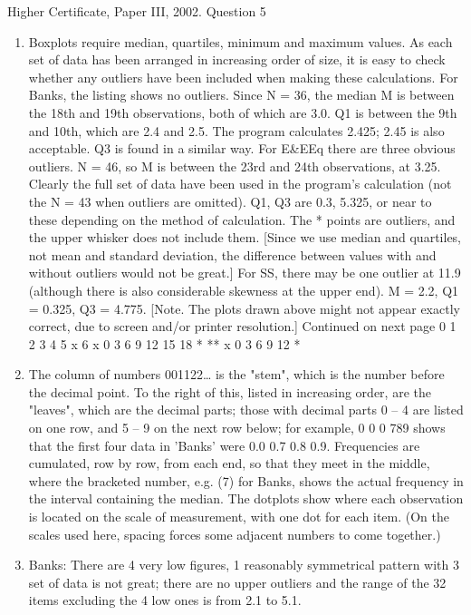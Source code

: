 \documentclass[a4paper,12pt]{article}
\begin{document}
Higher Certificate, Paper III, 2002. Question 5
\begin{enumerate} 
\item  Boxplots require median, quartiles, minimum and maximum values. As each
set of data has been arranged in increasing order of size, it is easy to check whether
any outliers have been included when making these calculations.
For Banks, the listing shows no outliers. Since N = 36, the median M is between the
18th and 19th observations, both of which are 3.0. Q1 is between the 9th and 10th,
which are 2.4 and 2.5. The program calculates 2.425; 2.45 is also acceptable. Q3 is
found in a similar way.
For E&EEq there are three obvious outliers. N = 46, so M is between the 23rd and
24th observations, at 3.25. Clearly the full set of data have been used in the program's
calculation (not the N = 43 when outliers are omitted). Q1, Q3 are 0.3, 5.325, or near
to these depending on the method of calculation.
The * points are outliers, and the upper whisker does not include them. [Since we use
median and quartiles, not mean and standard deviation, the difference between values
with and without outliers would not be great.]
For SS, there may be one outlier at 11.9 (although there is also considerable skewness
at the upper end). M = 2.2, Q1 = 0.325, Q3 = 4.775.
[Note. The plots drawn above might not appear exactly correct, due to screen and/or printer
resolution.]
Continued on next page
0 1 2 3 4 5
x
6
x
0 3 6 9 12 15 18
* **
x
0 3 6 9 12
*
\item  The column of numbers 001122… is the "stem", which is the number before
the decimal point. To the right of this, listed in increasing order, are the "leaves",
which are the decimal parts; those with decimal parts 0 – 4 are listed on one row, and
5 – 9 on the next row below; for example,
0 0
0 789
shows that the first four data in
'Banks' were 0.0 0.7 0.8 0.9.
Frequencies are cumulated, row by row, from each end, so that they meet in the
middle, where the bracketed number, e.g. (7) for Banks, shows the actual frequency in
the interval containing the median.
The dotplots show where each observation is located on the scale of measurement,
with one dot for each item. (On the scales used here, spacing forces some adjacent
numbers to come together.)
\item  Banks: There are 4 very low figures, 1%
reasonably symmetrical pattern with 3%
set of data is not great; there are no upper outliers and the range of the 32 items
excluding the 4 low ones is from 2.1 to 5.1.

\end{enumerate}
\end{document}
